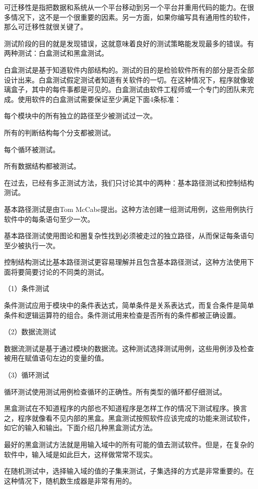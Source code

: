 可迁移性是指把数据和系统从一个平台移动到另一个平台并重用代码的能力。在很多情况下，这不是一个很重要的因素。另一方面，如果你编写具有通用性的软件，那么可迁移性就很关键了。

测试阶段的目的就是发现错误，这就意味着良好的测试策略能发现最多的错误。有两种测试：白盒测试和黑盒测试。

白盒测试是基于知道软件内部结构的。测试的目的是检验软件所有的部分是否全部设计出来。白盒测试假定测试者知道有关软件的一切。在这种情况下，程序就像玻璃盒子，其中的每件事都是可见的。白盒测试由软件工程师或一个专门的团队来完成。使用软件的白盒测试需要保证至少满足下面4条标准：

每个模块中的所有独立的路径至少被测试过一次。

所有的判断结构每个分支都被测试。

每个循环被测试。

所有数据结构都被测试。

在过去，已经有多正测试方法，我们只讨论其中的两种：基本路径测试和控制结构测试。

基本路径测试是由Tom McCabe提出。这种方法创建一组测试用例，这些用例执行软件中的每条语句至少一次。

基本路径测试使用图论和圈复杂性找到必须被走过的独立路径，从而保证每条语句至少被执行一次。

控制结构测试比基本路径测试更容易理解并且包含基本路径测试，这种方法使用下面将要简要讨论的不同类的测试。

（1）条件测试

条件测试应用于模块中的条件表达式，简单条件是关系表达式，而复合条件是简单条件和逻辑运算符的组合。条件测试用来检查是否所有的条件都被正确设置。

（2）数据流测试

数据流测试是基于通过模块的数据流。这种测试选择测试用例，这些用例涉及检查被用在赋值语句左边的变量的值。

（3）循环测试

循环测试使用测试用例检查循环的正确性。所有类型的循环都仔细测试。

黑盒测试在不知道程序的内部也不知道程序是怎样工作的情况下测试程序。换言之，程序就像看不见内部的黑盒。黑盒测试按照软件应该完成的功能来测试软件，如它的输入和输出。下面介绍几种黑盒测试方法。

最好的黑盒测试方法就是用输入域中的所有可能的值去测试软件。但是，在复杂的软件中，输入域是如此巨大，这样做常常不现实。

在随机测试中，选择输入域的值的子集来测试，子集选择的方式是非常重要的。在这种情况下，随机数生成器是非常有用的。

